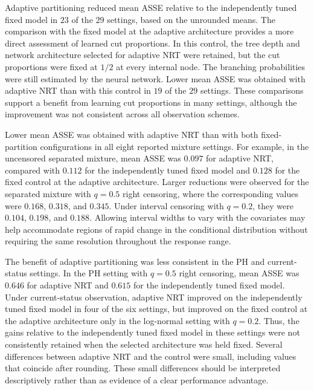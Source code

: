\documentclass[11pt]{article}
\numberwithin{equation}{section}
\begin{document}
Adaptive partitioning reduced mean ASSE relative to the independently tuned fixed model in $23$ of the $29$ settings, based on the unrounded means. The comparison with the fixed model at the adaptive architecture provides a more direct assessment of learned cut proportions. In this control, the tree depth and network architecture selected for adaptive NRT were retained, but the cut proportions were fixed at $1/2$ at every internal node. The branching probabilities were still estimated by the neural network. Lower mean ASSE was obtained with adaptive NRT than with this control in $19$ of the $29$ settings. These comparisons support a benefit from learning cut proportions in many settings, although the improvement was not consistent across all observation schemes.

Lower mean ASSE was obtained with adaptive NRT than with both fixed-partition configurations in all eight reported mixture settings. For example, in the uncensored separated mixture, mean ASSE was $0.097$ for adaptive NRT, compared with $0.112$ for the independently tuned fixed model and $0.128$ for the fixed control at the adaptive architecture. Larger reductions were observed for the separated mixture with $q=0.5$ right censoring, where the corresponding values were $0.168$, $0.318$, and $0.345$. Under interval censoring with $q=0.2$, they were $0.104$, $0.198$, and $0.188$. Allowing interval widths to vary with the covariates may help accommodate regions of rapid change in the conditional distribution without requiring the same resolution throughout the response range.

The benefit of adaptive partitioning was less consistent in the PH and current-status settings. In the PH setting with $q=0.5$ right censoring, mean ASSE was $0.646$ for adaptive NRT and $0.615$ for the independently tuned fixed model. Under current-status observation, adaptive NRT improved on the independently tuned fixed model in four of the six settings, but improved on the fixed control at the adaptive architecture only in the log-normal setting with $q=0.2$. Thus, the gains relative to the independently tuned fixed model in these settings were not consistently retained when the selected architecture was held fixed. Several differences between adaptive NRT and the control were small, including values that coincide after rounding. These small differences should be interpreted descriptively rather than as evidence of a clear performance advantage.
\end{document}
